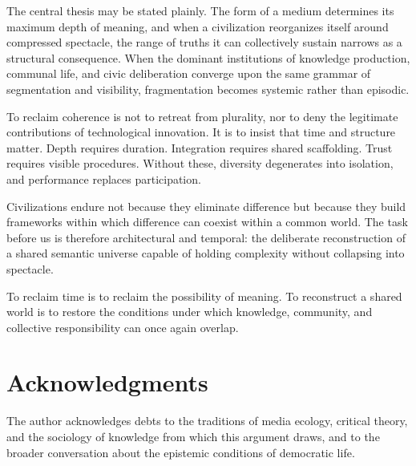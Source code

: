 \documentclass[11pt]{article}
\begin{document}
The central thesis may be stated plainly. The form of a medium determines its maximum depth of meaning, and when a civilization reorganizes itself around compressed spectacle, the range of truths it can collectively sustain narrows as a structural consequence. When the dominant institutions of knowledge production, communal life, and civic deliberation converge upon the same grammar of segmentation and visibility, fragmentation becomes systemic rather than episodic.

To reclaim coherence is not to retreat from plurality, nor to deny the legitimate contributions of technological innovation. It is to insist that time and structure matter. Depth requires duration. Integration requires shared scaffolding. Trust requires visible procedures. Without these, diversity degenerates into isolation, and performance replaces participation.

Civilizations endure not because they eliminate difference but because they build frameworks within which difference can coexist within a common world. The task before us is therefore architectural and temporal: the deliberate reconstruction of a shared semantic universe capable of holding complexity without collapsing into spectacle.

To reclaim time is to reclaim the possibility of meaning. To reconstruct a shared world is to restore the conditions under which knowledge, community, and collective responsibility can once again overlap.

\newpage

\section*{Acknowledgments}
The author acknowledges debts to the traditions of media ecology, critical theory, and the sociology of knowledge from which this argument draws, and to the broader conversation about the epistemic conditions of democratic life.
\end{document}
